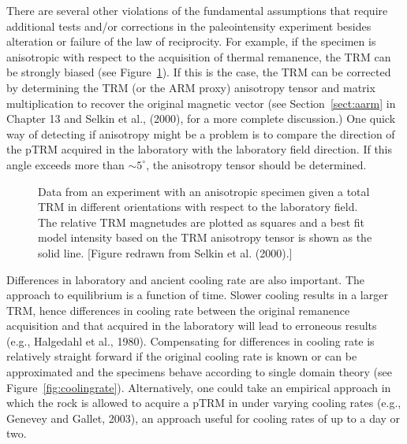 There are several other violations of the fundamental assumptions that require additional tests 
 and/or corrections in the paleointensity experiment besides alteration or failure of the law of reciprocity.   For example, if the specimen is anisotropic with respect to the acquisition of thermal remanence, the  TRM can be strongly biased (see Figure~\ref{fig:trm-anis}).  If this is the case, the TRM can be corrected by determining the TRM  (or the ARM proxy) anisotropy tensor and matrix multiplication to recover the original magnetic vector (see Section~\ref{sect:aarm} in Chapter 13 and 
 Selkin et al., (2000), for a more complete discussion.) \nocite{selkin00b}   One quick way of detecting if anisotropy might be a problem is to compare the direction of the pTRM acquired in the laboratory with the laboratory field direction.  If this angle exceeds more than $\sim 5 ^{\circ}$,  the anisotropy tensor should be determined.   
 
\begin{figure}[h!tb]
\epsfxsize 12cm
\centering {}
\caption{Data from an experiment with an anisotropic specimen given a total TRM in different orientations with respect to the laboratory field.  The relative TRM magnetudes are plotted as squares and a best fit model intensity based on the TRM anisotropy tensor is shown as the solid line.  [Figure redrawn from Selkin et al. (2000).]}
\label{fig:trm-anis}
\end{figure}


 
 Differences in laboratory and ancient cooling rate are also important. The approach to equilibrium is a function of time. Slower cooling results in a larger TRM, hence differences in 
 cooling rate between the original remanence acquisition and that acquired in the laboratory will
 lead to erroneous results (e.g., 
 Halgedahl et al., 1980).   \nocite{halgedahl80}   Compensating for differences in cooling rate is relatively straight forward if the  original cooling rate is  known  or can be approximated and the specimens behave according to single domain theory (see Figure~\ref{fig:coolingrate}).  Alternatively, one could take an empirical approach in which the rock is allowed to acquire a pTRM in under varying cooling rates (e.g., 
 Genevey and Gallet, 2003),       \nocite{genevey03}
  an approach useful for cooling rates of up to a day or two.  
 
